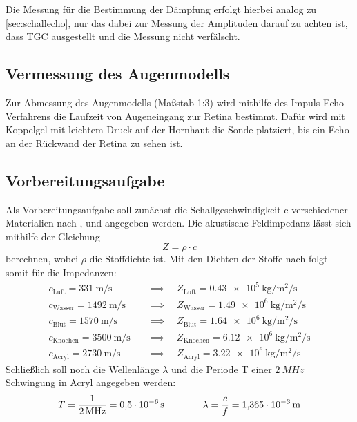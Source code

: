 Die Messung für die Bestimmung der Dämpfung erfolgt hierbei analog zu \autoref{sec:schallecho}, 
nur das dabei zur Messung der Amplituden darauf zu achten ist, dass TGC ausgestellt und die Messung nicht verfälscht.


\subsection{Vermessung des Augenmodells}

Zur Abmessung des Augenmodells (Maßstab 1:3) wird mithilfe des Impuls-Echo-Verfahrens die Laufzeit von Augeneingang zur Retina bestimmt.
Dafür wird mit Koppelgel mit leichtem Druck auf der Hornhaut die Sonde platziert, bis ein Echo an der Rückwand der Retina zu sehen ist.


\subsection{Vorbereitungsaufgabe}

Als Vorbereitungsaufgabe soll zunächst die Schallgeschwindigkeit c verschiedener Materialien nach \cite{schallgeschw}, \cite{schallgeschw2} und \cite{schallgeschw3} angegeben werden.
Die akustische Feldimpedanz lässt sich mithilfe der Gleichung
\begin{equation*}
    Z = \rho \cdot c
\end{equation*}
berechnen, wobei $\rho$ die Stoffdichte ist. Mit den Dichten der Stoffe nach \cite{akimpedanz} folgt somit für die Impedanzen:
\begin{align*}
    c_\text{Luft}           =  \qty{331}{\meter\per\second} \quad &\implies \quad Z_\text{Luft}           = \qty{0.43e5}{\kilo\gram\per\meter\squared\per\second} \\
    c_\text{Wasser}         = \qty{1492}{\meter\per\second} \quad &\implies \quad Z_\text{Wasser}         = \qty{1.49e6}{\kilo\gram\per\meter\squared\per\second} \\
    c_\text{Blut}           = \qty{1570}{\meter\per\second} \quad &\implies \quad Z_\text{Blut}           = \qty{1.64e6}{\kilo\gram\per\meter\squared\per\second} \\
    c_\text{Knochen}        = \qty{3500}{\meter\per\second} \quad &\implies \quad Z_\text{Knochen}        = \qty{6.12e6}{\kilo\gram\per\meter\squared\per\second} \\
    c_\text{Acryl}          = \qty{2730}{\meter\per\second} \quad &\implies \quad Z_\text{Acryl}          = \qty{3.22e6}{\kilo\gram\per\meter\squared\per\second} 
\end{align*}
Schließlich soll noch die Wellenlänge $\lambda$ und die Periode T einer $\qty{2}{MHz}$ Schwingung in Acryl angegeben werden:
\begin{align*}
    T = \frac{1}{\qty{2}{MHz}} = \qty{0.5e{-6}}{\second} \qquad \qquad \lambda = \frac{c}{f} = \qty{1.365e{-3}}{m}
\end{align*}